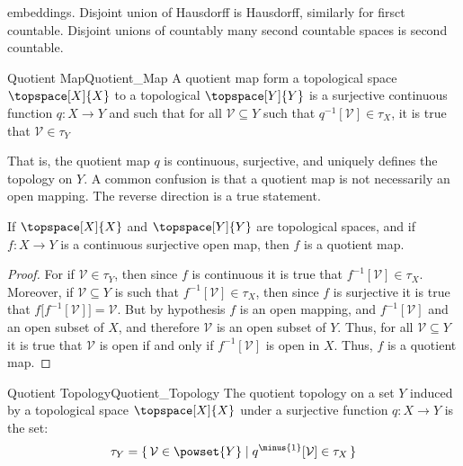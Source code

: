     embeddings. Disjoint union of Hausdorff is Hausdorff, similarly for
    firsct countable. Disjoint unions of countably many second countable
    spaces is second countable.
    \begin{fdefinition}{Quotient Map}{Quotient_Map}
        A quotient map form a topological space $\topspace[X]{X}$ to a
        topological $\topspace[Y]{Y}$ is a surjective continuous function
        $q:X\rightarrow{Y}$ and such that for all
        $\mathcal{V}\subseteq{Y}$ such that
        $q^{\minus{1}}[\mathcal{V}]\in\tau_{X}$, it is true that
        $\mathcal{V}\in\tau_{Y}$
    \end{fdefinition}
    That is, the quotient map $q$ is continuous, surjective, and uniquely
    defines the topology on $Y$. A common confusion is that a quotient map
    is not necessarily an open mapping. The reverse direction is a true
    statement.
    \begin{theorem}
        If $\topspace[X]{X}$ and $\topspace[Y]{Y}$ are topological spaces,
        and if $f:X\rightarrow{Y}$ is a continuous surjective open map,
        then $f$ is a quotient map.
    \end{theorem}
    \begin{proof}
        For if $\mathcal{V}\in\tau_{Y}$, then since $f$ is continuous it is
        true that $f^{\minus{1}}[\mathcal{V}]\in\tau_{X}$. Moreover, if
        $\mathcal{V}\subseteq{Y}$ is such that
        $f^{\minus{1}}[\mathcal{V}]\in\tau_{X}$, then since $f$ is
        surjective it is true that
        $f\big[f^{\minus{1}}[\mathcal{V}]\big]=\mathcal{V}$. But
        by hypothesis $f$ is an open mapping, and
        $f^{\minus{1}}[\mathcal{V}]$ and an open subset of $X$, and
        therefore $\mathcal{V}$ is an open subset of $Y$. Thus, for all
        $\mathcal{V}\subseteq{Y}$ it is true that $\mathcal{V}$ is open if
        and only if $f^{\minus{1}}[\mathcal{V}]$ is open in $X$. Thus,
        $f$ is a quotient map.
    \end{proof}
    \begin{fdefinition}{Quotient Topology}{Quotient_Topology}
        The quotient topology on a set $Y$ induced by a topological space
        $\topspace[X]{X}$ under a surjective function $q:X\rightarrow{Y}$
        is the set:
        \begin{equation*}
            \tau_{Y}=\{\,\mathcal{V}\in\powset{Y}\;|\;
                q^{\minus{1}}[\mathcal{V}]\in\tau_{X}\,\}
        \end{equation*}
    \end{fdefinition}
